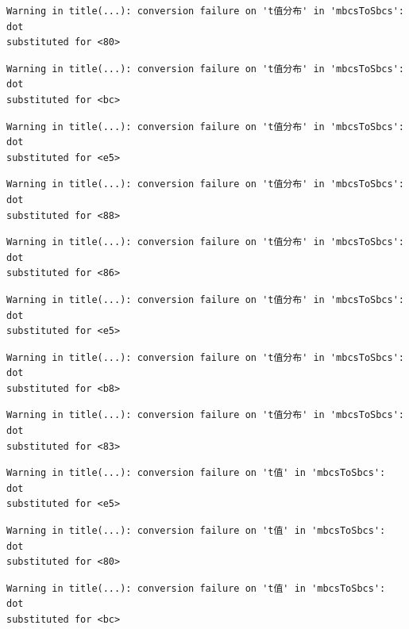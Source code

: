 \documentclass[
  letterpaper,
  DIV=11,
  numbers=noendperiod]{scrreprt}
\begin{document}
\begin{verbatim}
Warning in title(...): conversion failure on 't值分布' in 'mbcsToSbcs': dot
substituted for <80>
\end{verbatim}

\begin{verbatim}
Warning in title(...): conversion failure on 't值分布' in 'mbcsToSbcs': dot
substituted for <bc>
\end{verbatim}

\begin{verbatim}
Warning in title(...): conversion failure on 't值分布' in 'mbcsToSbcs': dot
substituted for <e5>
\end{verbatim}

\begin{verbatim}
Warning in title(...): conversion failure on 't值分布' in 'mbcsToSbcs': dot
substituted for <88>
\end{verbatim}

\begin{verbatim}
Warning in title(...): conversion failure on 't值分布' in 'mbcsToSbcs': dot
substituted for <86>
\end{verbatim}

\begin{verbatim}
Warning in title(...): conversion failure on 't值分布' in 'mbcsToSbcs': dot
substituted for <e5>
\end{verbatim}

\begin{verbatim}
Warning in title(...): conversion failure on 't值分布' in 'mbcsToSbcs': dot
substituted for <b8>
\end{verbatim}

\begin{verbatim}
Warning in title(...): conversion failure on 't值分布' in 'mbcsToSbcs': dot
substituted for <83>
\end{verbatim}

\begin{verbatim}
Warning in title(...): conversion failure on 't值' in 'mbcsToSbcs': dot
substituted for <e5>
\end{verbatim}

\begin{verbatim}
Warning in title(...): conversion failure on 't值' in 'mbcsToSbcs': dot
substituted for <80>
\end{verbatim}

\begin{verbatim}
Warning in title(...): conversion failure on 't值' in 'mbcsToSbcs': dot
substituted for <bc>
\end{verbatim}
\end{document}
